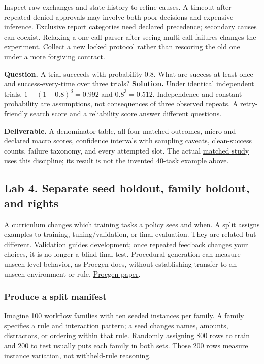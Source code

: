 \documentclass[
  11pt,
  letterpaper,
]{article}
\begin{document}
Inspect raw exchanges and state history to refine causes. A timeout
after repeated denied approvals may involve both poor decisions and
expensive inference. Exclusive report categories need declared
precedence; secondary causes can coexist. Relaxing a one-call parser
after seeing multi-call failures changes the experiment. Collect a new
locked protocol rather than rescoring the old one under a more forgiving
contract.

\textbf{Question.} A trial succeeds with probability 0.8. What are
success-at-least-once and success-every-time over three trials?
\textbf{Solution.} Under identical independent trials,
\(1-(1-0.8)^3=0.992\) and \(0.8^3=0.512\). Independence and constant
probability are assumptions, not consequences of three observed repeats.
A retry-friendly search score and a reliability score answer different
questions.

\textbf{Deliverable.} A denominator table, all four matched outcomes,
micro and declared macro scores, confidence intervals with sampling
caveats, clean-success counts, failure taxonomy, and every attempted
slot. The actual \href{../workflow-model-study-results.md}{matched
study} uses this discipline; its result is not the invented 40-task
example above.

\subsection{Lab 4. Separate seed holdout, family holdout, and
rights}\label{lab-4.-separate-seed-holdout-family-holdout-and-rights}

A curriculum changes which training tasks a policy sees and when. A
split assigns examples to training, tuning/validation, or final
evaluation. They are related but different. Validation guides
development; once repeated feedback changes your choices, it is no
longer a blind final test. Procedural generation can measure
unseen-level behavior, as Procgen does, without establishing transfer to
an unseen environment or rule.
\href{https://arxiv.org/abs/1912.01588}{Procgen paper}.

\subsubsection{Produce a split manifest}\label{produce-a-split-manifest}

Imagine 100 workflow families with ten seeded instances per family. A
family specifies a rule and interaction pattern; a seed changes names,
amounts, distractors, or ordering within that rule. Randomly assigning
800 rows to train and 200 to test usually puts each family in both sets.
Those 200 rows measure instance variation, not withheld-rule reasoning.
\end{document}
